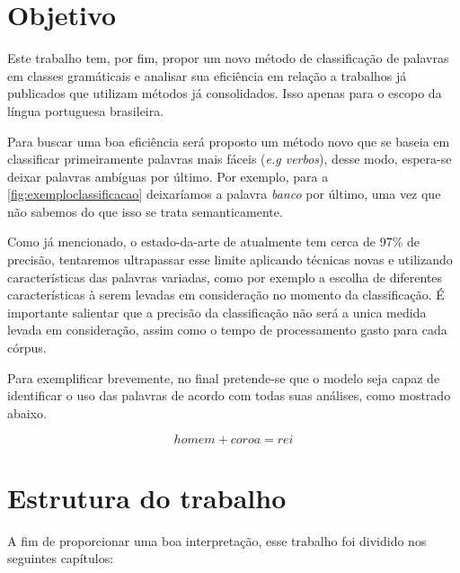 \section{Objetivo}\label{sec:objetivo}

Este trabalho tem, por fim, propor um novo método de classificação de palavras em classes gramáticais e analisar sua eficiência em relação a trabalhos já publicados que utilizam métodos já consolidados. Isso apenas para o escopo da língua portuguesa brasileira. 

Para buscar uma boa eficiência será proposto um método novo que se baseia em classificar primeiramente palavras mais fáceis (\textit{e.g verbos}), desse modo, espera-se deixar palavras ambíguas por último. Por exemplo, para a \autoref{fig:exemploclassificacao} deixaríamos a palavra \textit{banco} por último, uma vez que não sabemos do que isso se trata semanticamente.  

Como já mencionado, o estado-da-arte de atualmente tem cerca de 97\% de precisão, tentaremos ultrapassar esse limite aplicando técnicas novas e utilizando características das palavras variadas, como por exemplo a escolha de diferentes características à serem levadas em consideração no momento da classificação. É importante salientar que a precisão da classificação não será a unica medida levada em consideração, assim como o tempo de processamento gasto para cada córpus.

Para exemplificar brevemente, no final pretende-se que o modelo seja capaz de identificar o uso das palavras de acordo com todas suas análises, como mostrado abaixo.

\begin{equation}
homem + coroa = rei \label{eq:exemploobjetivo}
\end{equation}



\section{Estrutura do trabalho}\label{sec:estruturadotrabalho}

A fim de proporcionar uma boa interpretação, esse trabalho foi dividido nos
seguintes capítulos:

